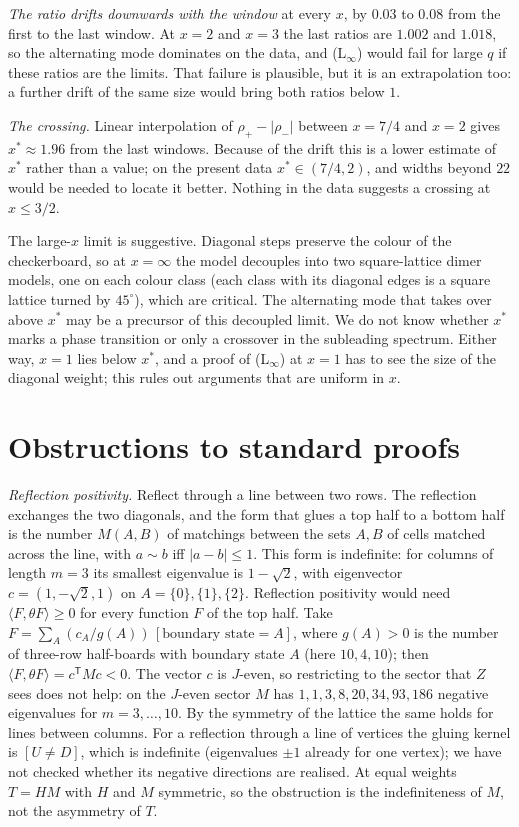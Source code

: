 \documentclass[11pt]{amsart}
\theoremstyle{definition}
\theoremstyle{remark}
\begin{document}
\emph{The ratio drifts downwards with the window} at every $x$, by $0.03$ to $0.08$ from the first
to the last window. At $x = 2$ and $x = 3$ the last ratios are $1.002$ and $1.018$, so the
alternating mode dominates on the data, and (L$_\infty$) would fail for large $q$ if these ratios
are the limits. That failure is plausible, but it is an extrapolation too: a further drift of the
same size would bring both ratios below $1$.

\emph{The crossing.} Linear interpolation of $\rho_+ - |\rho_-|$ between $x = 7/4$ and $x = 2$ gives
$x^* \approx 1.96$ from the last windows. Because of the drift this is a lower estimate of $x^*$
rather than a value; on the present data $x^* \in (7/4, 2)$, and widths beyond $22$ would be needed
to locate it better. Nothing in the data suggests a crossing at $x \le 3/2$.

The large-$x$ limit is suggestive. Diagonal steps preserve the colour of the checkerboard, so at
$x = \infty$ the model decouples into two square-lattice dimer models, one on each colour class
(each class with its diagonal edges is a square lattice turned by $45^\circ$), which are critical.
The alternating mode that takes over above $x^*$ may be a precursor of this decoupled limit. We do
not know whether $x^*$ marks a phase transition or only a crossover in the subleading spectrum.
Either way, $x = 1$ lies below $x^*$, and a proof of (L$_\infty$) at $x = 1$ has to see the size of the
diagonal weight; this rules out arguments that are uniform in $x$.

\section{Obstructions to standard proofs}\label{sec:obstructions}

\emph{Reflection positivity.} Reflect through a line between two rows. The reflection exchanges the
two diagonals, and the form that glues a top half to a bottom half is the number $M(A, B)$ of
matchings between the sets $A, B$ of cells matched across the line, with $a \sim b$ iff
$|a - b| \le 1$. This form is indefinite: for columns of length $m = 3$ its smallest eigenvalue is
$1 - \sqrt2$, with eigenvector $c = (1, -\sqrt2, 1)$ on $A = \{0\}, \{1\}, \{2\}$. Reflection
positivity would need $\langle F, \theta F\rangle \ge 0$ for every function $F$ of the top half. Take
$F = \sum_A (c_A / g(A))\,[\text{boundary state} = A]$, where $g(A) > 0$ is the number of three-row
half-boards with boundary state $A$ (here $10, 4, 10$); then $\langle F, \theta F\rangle = c^{\mathsf T}
M c < 0$. The vector $c$ is $J$-even, so restricting to the sector that $Z$ sees does not help: on the
$J$-even sector $M$ has $1, 1, 3, 8, 20, 34, 93, 186$ negative eigenvalues for $m = 3, \dots, 10$. By
the symmetry of the lattice the same holds for lines between columns. For a reflection through a line
of vertices the gluing kernel is $[U \ne D]$, which is indefinite (eigenvalues $\pm1$ already for
one vertex); we have not checked whether its negative directions are realised. At equal weights
$T = HM$ with $H$ and $M$ symmetric, so the obstruction is the indefiniteness of $M$, not the
asymmetry of $T$.
\end{document}
